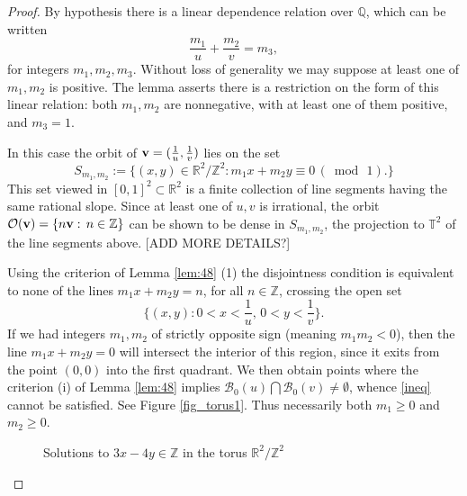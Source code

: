 \documentclass[12pt,letterpaper, reqno]{amsart}
\theoremstyle{definition}
\theoremstyle{remark}
\newtheorem{rmk}[thm]{Remark}
\newcommand{\RR}{\ensuremath{\mathbb{R}}}
\newcommand{\ZZ}{\ensuremath{\mathbb{Z}}}
\newcommand{\QQ}{\mathbb{Q}}
\newcommand{\TT}{\mathbb{T}}
\newcommand{\sB}{{\mathcal B}}
\newcommand{\bv}{{\bf v}}
\newcommand{\sO}{{\mathcal O}}
\begin{document}
\begin{proof} 
By hypothesis there is a linear dependence relation over $\QQ$,
which can be written
$$
  \frac{m_1}{u} + \frac{m_2}{v}= m_3,
$$
for integers $m_1, m_2, m_3$. Without loss of generality
we may suppose  at  least one of $m_1, m_2 $ is positive. The lemma asserts
there is  a restriction 
on the form of this linear relation: both $m_1, m_2$ are nonnegative,
with at least  one of them positive,  and $m_3=1$.



In this case the orbit of $\bv=(\frac{1}{u}, \frac{1}{v})$ lies on the set
$$
S_{m_1, m_2} :=  \{ (x, y) \in \RR^2/\ZZ^2 :  m_1 x + m_2 y  \equiv 0 \, (\bmod \, 1).\}
  $$
 This set viewed in $[0,1]^2 \subset \RR^2$ is a finite collection of line segments 
having the same rational slope. 
Since at  least one of $u, v$ is
irrational,  the orbit $\sO(\bv) = \{ n \bv: \, n \in \ZZ\}$ 
can be shown to be  dense in  $S_{m_1, m_2}$,
the projection 
to $\TT^2$ of the line segments above.  [ADD MORE DETAILS?]

Using the criterion of Lemma \ref{lem:48} (1)  the disjointness condition is equivalent
to none of 
the lines $m_1x+ m_2 y =n$, for all  $n \in \ZZ$, crossing the open 
set
\begin{equation}\label{box}
\{ (x,y) : 0 < x < \frac{1}{u}, \, 0 < y < \frac{1}{v} \}.
\end{equation}
If we had  integers $m_1, m_2$ of strictly opposite sign (meaning  $ m_1 m_2 <0$), then the line
$m_1 x +  m_2 y =0$ will intersect the interior of this region, since it exits from the point $(0,0)$
into the first quadrant. We then  obtain points where the criterion (i)
of Lemma \ref{lem:48} implies $\sB_0(u) \bigcap \sB_0(v) \ne \emptyset$, whence
\eqref{ineq} cannot be satisfied. See Figure \ref{fig_torus1}.
Thus necessarily  both $m_1 \ge 0$ and $m_2 \ge 0$.

\begin{figure}[h]
\begin{center}
\end{center}
\caption{Solutions to $3x-4y\in\ZZ$ in the torus $\RR^2/\ZZ^2$}
\end{figure} \label{fig_torus1}



\end{proof}
\end{document}
